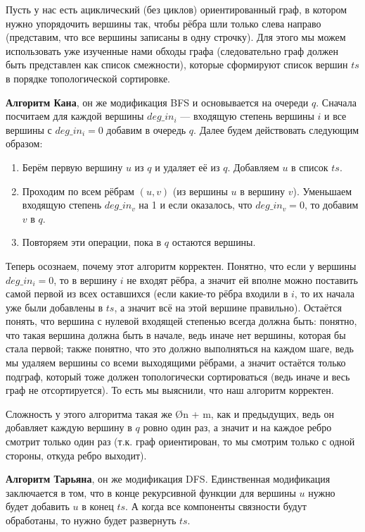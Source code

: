 Пусть у нас есть ациклический (без циклов) ориентированный граф, в котором нужно упорядочить вершины так, чтобы рёбра шли только слева направо (представим, что все вершины записаны в одну строчку). Для этого мы можем использовать уже изученные нами обходы графа (следовательно граф должен быть представлен как список смежности), которые сформируют список вершин $ts$ в порядке топологической сортировке. 

\textbf{Алгоритм Кана}, он же модификация BFS и основывается на очереди $q$. Сначала посчитаем для каждой вершины $deg\_in_i$ — входящую степень вершины $i$ и все вершины с $deg\_in_i = 0$ добавим в очередь $q$. Далее будем действовать следующим образом:

\begin{enumerate}
    \item Берём первую вершину $u$ из $q$ и удаляет её из $q$. Добавляем $u$ в список $ts$.
    \item Проходим по всем рёбрам $(u, v)$ (из вершины $u$ в вершину $v$). Уменьшаем входящую степень $deg\_in_v$ на 1 и если оказалось, что $deg\_in_v = 0$, то добавим $v$ в $q$.
    \item Повторяем эти операции, пока в $q$ остаются вершины.
\end{enumerate}

Теперь осознаем, почему этот алгоритм корректен. Понятно, что если у вершины $deg\_in_i = 0$, то в вершину $i$ не входят рёбра, а значит ей вполне можно поставить самой первой из всех оставшихся (если какие-то рёбра входили в $i$, то их начала уже были добавлены в $ts$, а значит всё на этой вершине правильно). Остаётся понять, что вершина с нулевой входящей степенью всегда должна быть: понятно, что такая вершина должна быть в начале, ведь иначе нет вершины, которая бы стала первой; также понятно, что это должно выполняться на каждом шаге, ведь мы удаляем вершины со всеми выходящими рёбрами, а значит остаётся только подграф, который тоже должен топологически сортироваться (ведь иначе и весь граф не отсортируется). То есть мы выяснили, что наш алгоритм корректен.

Сложность у этого алгоритма такая же \O{n + m}, как и предыдущих, ведь он добавляет каждую вершину в $q$ ровно один раз, а значит и на каждое ребро смотрит только один раз (т.к. граф ориентирован, то мы смотрим только с одной стороны, откуда ребро выходит).

\textbf{Алгоритм Тарьяна}, он же модификация DFS. Единственная модификация заключается в том, что в конце рекурсивной функции для вершины $u$ нужно будет добавить $u$ в конец $ts$. А когда все компоненты связности будут обработаны, то нужно будет развернуть $ts$.

